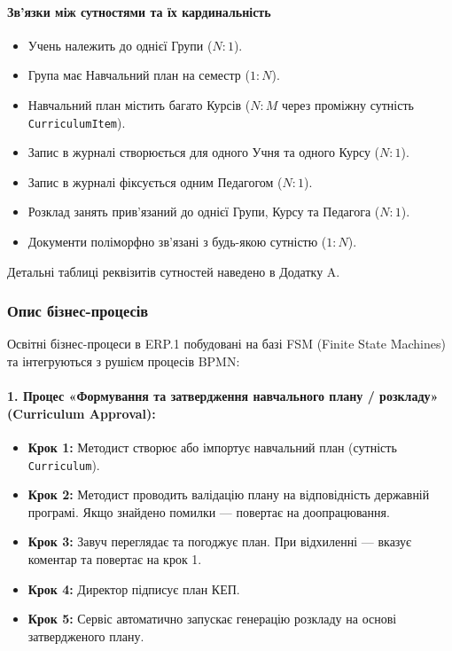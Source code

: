 \documentclass{article}
\begin{document}
\paragraph{Зв'язки між сутностями та їх кардинальність}
\begin{itemize}
    \item Учень належить до однієї Групи ($N:1$).
    \item Група має Навчальний план на семестр ($1:N$).
    \item Навчальний план містить багато Курсів ($N:M$ через проміжну сутність \texttt{CurriculumItem}).
    \item Запис в журналі створюється для одного Учня та одного Курсу ($N:1$).
    \item Запис в журналі фіксується одним Педагогом ($N:1$).
    \item Розклад занять прив'язаний до однієї Групи, Курсу та Педагога ($N:1$).
    \item Документи поліморфно зв'язані з будь-якою сутністю ($1:N$).
\end{itemize}
Детальні таблиці реквізитів сутностей наведено в Додатку A.

\subsubsection{Опис бізнес-процесів}
Освітні бізнес-процеси в ERP.1 побудовані на базі FSM (Finite State Machines) та інтегруються з рушієм процесів BPMN:

\paragraph{1. Процес «Формування та затвердження навчального плану / розкладу» (Curriculum Approval):}
\begin{itemize}
    \item \textbf{Крок 1:} Методист створює або імпортує навчальний план (сутність \texttt{Curriculum}).
    \item \textbf{Крок 2:} Методист проводить валідацію плану на відповідність державній програмі. Якщо знайдено помилки --- повертає на доопрацювання.
    \item \textbf{Крок 3:} Завуч переглядає та погоджує план. При відхиленні --- вказує коментар та повертає на крок 1.
    \item \textbf{Крок 4:} Директор підписує план КЕП.
    \item \textbf{Крок 5:} Сервіс автоматично запускає генерацію розкладу на основі затвердженого плану.
\end{itemize}
\end{document}
